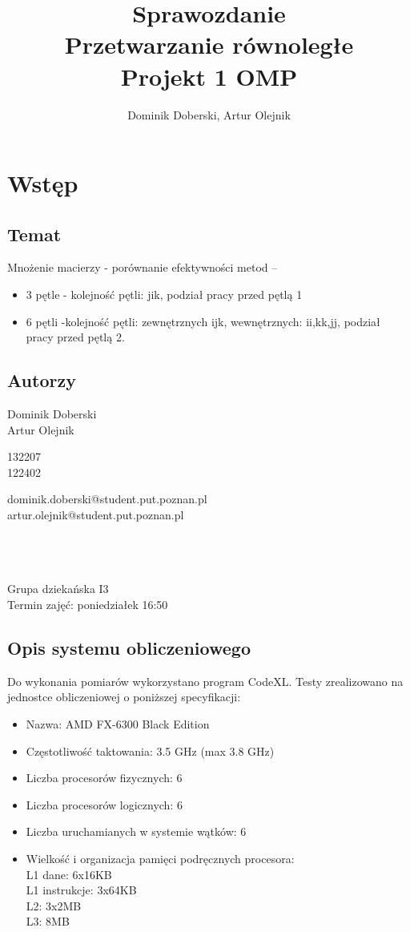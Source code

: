 \documentclass{article}
\author{Dominik Doberski, Artur Olejnik}
\title{
\huge Sprawozdanie 
\\Przetwarzanie równoległe\\
\Huge Projekt 1 OMP}
\begin{document}
\maketitle

\section{Wstęp}
\subsection{Temat}
Mnożenie macierzy - porównanie efektywności metod --
\begin{itemize}
\item 3 pętle - kolejność pętli: jik, podział pracy przed pętlą 1
\item 6 pętli -kolejność pętli: zewnętrznych ijk, wewnętrznych: ii,kk,jj, podział pracy przed pętlą 2.
\end{itemize}
\subsection{Autorzy}
\begin{minipage}[t]{0.3\textwidth}
Dominik Doberski\\
Artur Olejnik
\end{minipage}
\begin{minipage}[t]{0.15\textwidth}
132207\\
122402
\end{minipage}
\begin{minipage}[t]{0.55\textwidth}
dominik.doberski@student.put.poznan.pl\\
artur.olejnik@student.put.poznan.pl
\end{minipage}
\\\\\\
Grupa dziekańska I3\\
Termin zajęć: poniedziałek 16:50 
\subsection{Opis systemu obliczeniowego}
Do wykonania pomiarów wykorzystano program CodeXL. Testy zrealizowano na jednostce obliczeniowej o poniższej specyfikacji:
\begin{itemize}
\item Nazwa: AMD FX-6300 Black Edition
\item Częstotliwość taktowania: 3.5 GHz (max 3.8 GHz)
\item Liczba procesorów fizycznych: 6
\item Liczba procesorów logicznych: 6
\item Liczba uruchamianych w systemie wątków: 6
\item Wielkość i organizacja pamięci podręcznych procesora:\\
L1 dane: 6x16KB\\
L1 instrukcje: 3x64KB\\
L2: 3x2MB\\
L3: 8MB\\
\end{itemize}
\end{document}

